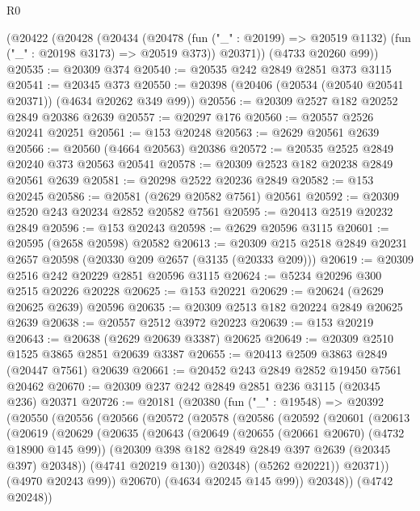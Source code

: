 \begin{lexlean}{R0}
\begin{coremodule}
    (@20422
      (@20428
        (@20434
          (@20478 (fun ("_" : @20199) => @20519 @1132) (fun ("_" : @20198 @3173) => @20519 @373))
          @20371))
      (@4733 @20260 @99))
@20535 := @20309 @374
@20540 := @20535 @242 @2849 @2851 @373 @3115
@20541 := @20345 @373
@20550 := @20398 (@20406 (@20534 (@20540 @20541 @20371)) (@4634 @20262 @349 @99))
@20556 := @20309 @2527 @182 @20252 @2849 @20386 @2639
@20557 := @20297 @176
@20560 := @20557 @2526 @20241 @20251
@20561 := @153 @20248
@20563 := @2629 @20561 @2639
@20566 := @20560 (@4664 @20563) @20386
@20572 := @20535 @2525 @2849 @20240 @373 @20563 @20541
@20578 := @20309 @2523 @182 @20238 @2849 @20561 @2639
@20581 := @20298 @2522 @20236 @2849
@20582 := @153 @20245
@20586 := @20581 (@2629 @20582 @7561) @20561
@20592 := @20309 @2520 @243 @20234 @2852 @20582 @7561
@20595 := @20413 @2519 @20232 @2849
@20596 := @153 @20243
@20598 := @2629 @20596 @3115
@20601 := @20595 (@2658 @20598) @20582
@20613 := @20309 @215 @2518 @2849 @20231 @2657 @20598 (@20330 @209 @2657 (@3135 (@20333 @209)))
@20619 := @20309 @2516 @242 @20229 @2851 @20596 @3115
@20624 := @5234 @20296 @300 @2515 @20226 @20228
@20625 := @153 @20221
@20629 := @20624 (@2629 @20625 @2639) @20596
@20635 := @20309 @2513 @182 @20224 @2849 @20625 @2639
@20638 := @20557 @2512 @3972 @20223
@20639 := @153 @20219
@20643 := @20638 (@2629 @20639 @3387) @20625
@20649 := @20309 @2510 @1525 @3865 @2851 @20639 @3387
@20655 := @20413 @2509 @3863 @2849 (@20447 @7561) @20639
@20661 := @20452 @243 @2849 @2852 @19450 @7561 @20462
@20670 := @20309 @237 @242 @2849 @2851 @236 @3115 (@20345 @236) @20371
@20726 := @20181
    (@20380
      (fun ("_" : @19548) =>
      @20392
        (@20550
          (@20556
            (@20566
              (@20572
                (@20578
                  (@20586
                    (@20592
                      (@20601
                        (@20613
                          (@20619
                            (@20629
                              (@20635
                                (@20643
                                  (@20649
                                    (@20655 (@20661 @20670) (@4732 @18900 @145 @99))
                                    (@20309 @398 @182 @2849 @2849 @397 @2639 (@20345 @397) @20348))
                                  (@4741 @20219 @130))
                                @20348)
                              (@5262 @20221))
                            @20371))
                        (@4970 @20243 @99))
                      @20670)
                    (@4634 @20245 @145 @99))
                  @20348))
              (@4742 @20248))

\end{coremodule}
\end{lexlean}
